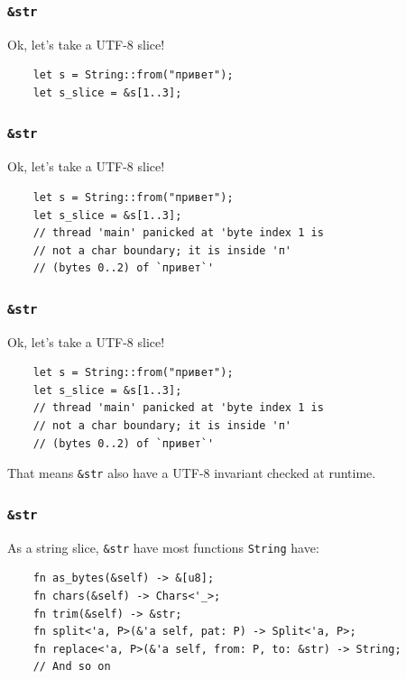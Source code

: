 \documentclass[aspectratio=1610,t]{beamer}
\begin{document}

\begin{frame}[fragile]
\frametitle{\texttt{\&str}}
Ok, let's take a UTF-8 slice!

\begin{verbatim}
    let s = String::from("привет");
    let s_slice = &s[1..3];
\end{verbatim}
\end{frame}


\begin{frame}[fragile]
\frametitle{\texttt{\&str}}
Ok, let's take a UTF-8 slice!

\begin{verbatim}
    let s = String::from("привет");
    let s_slice = &s[1..3];
    // thread 'main' panicked at 'byte index 1 is
    // not a char boundary; it is inside 'п'
    // (bytes 0..2) of `привет`'
\end{verbatim}
\end{frame}


\begin{frame}[fragile]
\frametitle{\texttt{\&str}}
Ok, let's take a UTF-8 slice!

\begin{verbatim}
    let s = String::from("привет");
    let s_slice = &s[1..3];
    // thread 'main' panicked at 'byte index 1 is
    // not a char boundary; it is inside 'п'
    // (bytes 0..2) of `привет`'
\end{verbatim}

That means \texttt{\&str} also have a UTF-8 invariant checked at runtime.
\end{frame}


\begin{frame}[fragile]
\frametitle{\texttt{\&str}}
As a string slice, \texttt{\&str} have most functions \texttt{String} have:

\begin{verbatim}
    fn as_bytes(&self) -> &[u8];
    fn chars(&self) -> Chars<'_>;
    fn trim(&self) -> &str;
    fn split<'a, P>(&'a self, pat: P) -> Split<'a, P>;
    fn replace<'a, P>(&'a self, from: P, to: &str) -> String;
    // And so on
\end{verbatim}
\end{frame}
\end{document}
